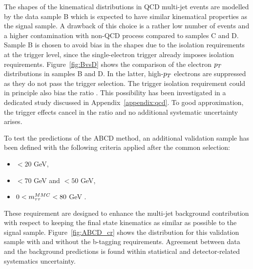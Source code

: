 The shapes of the kinematical distributions in QCD multi-jet events 
are modelled  by the data sample B which is expected to have similar kinematical properties as   the signal sample.
A drawback of this choice is a rather low number of events and a higher contamination with non-QCD process compared to samples C and D.
Sample B is chosen  to avoid  bias in the shapes due to the isolation requirements at the trigger level, since the single-electron trigger 
already imposes isolation requirements. 
Figure~\ref{fig:BvsD} shows the comparison of the electron $p_{T}$ distributions in samples B and D. In the latter, 
high-$p_{T}$ electrons are suppressed as they do not pass the trigger selection. 
The trigger isolation requirement could in principle also 
bias the ratio \rqcd. This possibility has been investigated 
in a dedicated study discussed in Appendix~\ref{appendix:qcd}.
To  good approximation, the  trigger effects cancel  in the ratio
\rqcd and no additional systematic uncertainty arises.




To test the predictions of the ABCD method,  an additional validation sample has been defined with the following criteria applied after
the common selection:
\begin{itemize}
\item \MET $< 20$ GeV,
\item \Ht $< 70$ GeV and \SumLtMET$ < 50$ GeV,
\item $0 < m_{\tau\tau}^{MMC} < 80$ GeV  .	 
\end{itemize}
These requirement are designed to enhance the multi-jet background contribution with respect to \Ztautau keeping the final 
state kinematics as similar as possible to the signal sample.
Figure~\ref{fig:ABCD_cr} shows the \mmc distribution for this validation sample with and without the  b-tagging requirements.
Agreement between data and the background predictions is found within statistical and detector-related systematics uncertainty. 


